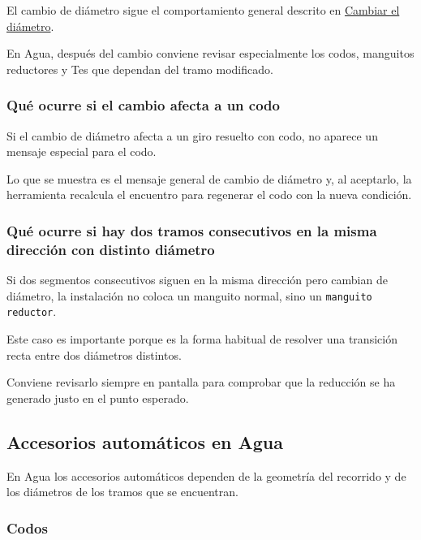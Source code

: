 El cambio de diámetro sigue el comportamiento general descrito en \hyperref[sec:cambiar-diametro]{Cambiar el diámetro}.

En Agua, después del cambio conviene revisar especialmente los codos, manguitos reductores y Tes que dependan del tramo modificado.

\subsubsection{Qué ocurre si el cambio afecta a un codo}

Si el cambio de diámetro afecta a un giro resuelto con codo, no aparece un mensaje especial para el codo.

Lo que se muestra es el mensaje general de cambio de diámetro y, al aceptarlo, la herramienta recalcula el encuentro para regenerar el codo con la nueva condición.


\subsubsection{Qué ocurre si hay dos tramos consecutivos en la misma dirección con distinto diámetro}

Si dos segmentos consecutivos siguen en la misma dirección pero cambian de diámetro, la instalación no coloca un manguito normal, sino un \texttt{manguito reductor}.

Este caso es importante porque es la forma habitual de resolver una transición recta entre dos diámetros distintos.

Conviene revisarlo siempre en pantalla para comprobar que la reducción se ha generado justo en el punto esperado.


\subsection{Accesorios automáticos en Agua}

En Agua los accesorios automáticos dependen de la geometría del recorrido y de los diámetros de los tramos que se encuentran.

\subsubsection{Codos}

